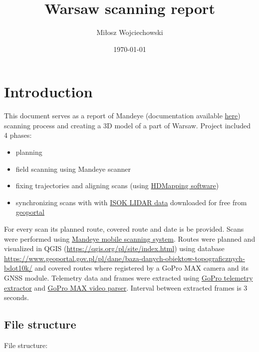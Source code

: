 \documentclass[a4paper,12pt]{book}
\begin{document}
	
\title{Warsaw scanning report}
\author{Miłosz Wojciechowski}
\date{\today}


\maketitle
\pagebreak
\tableofcontents
\pagebreak

\chapter{Introduction}
This document serves as a report of Mandeye (documentation available \href{https://github.com/JanuszBedkowski/mandeye_controller/tree/main/doc/manual/manual_v0_2}{here}) scanning process and creating a 3D model of a part of Warsaw. Project  included 4 phases:

\begin{itemize}
	\item planning
	\item field scanning using Mandeye scanner
	\item fixing trajectories and aligning scans (using \href{https://github.com/MapsHD/HDMapping}{HDMapping software})
	\item synchronizing scans with with \href{https://isok.gov.pl/index.html}{ISOK LIDAR data} downloaded for free from \href{https://www.geoportal.gov.pl}{geoportal}
\end{itemize}

For every scan its planned route, covered route and date is be provided. Scans were performed using \href{https://github.com/JanuszBedkowski/mandeye_controller/tree/main}{Mandeye mobile scanning system}. Routes were planned and visualized in QGIS (\url{https://qgis.org/pl/site/index.html}) using database \href{BDOT10k}{https://www.geoportal.gov.pl/pl/dane/baza-danych-obiektow-topograficznych-bdot10k/} and covered routes where registered by a GoPro MAX camera and its GNSS module. Telemetry data and frames were extracted using
\href{https://github.com/miloszwojciechowski/Warsaw-model/tree/main/GoPro-Telemetry-Extractor}{GoPro telemetry extractor} and \href{https://github.com/miloszwojciechowski/Warsaw-model/tree/main/GoPro_MAX_video_parser}{GoPro MAX video parser}. Interval between extracted frames is 3 seconds.\\

\pagebreak

\section{File structure}
File structure: 
\end{document}
